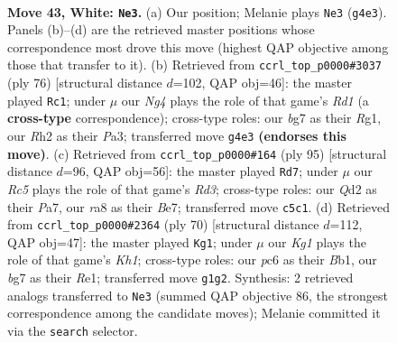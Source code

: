 \documentclass[11pt]{article}
\begin{document}
\clearpage

\begin{figure}[p]\centering
\begin{subfigure}{0.46\textwidth}\centering
\resizebox{\linewidth}{!}{%
\newchessgame
\chessboard[
  setfen={rn1qk2r/4n1b1/2p3p1/2Rp2P1/3P1PNp/1P5P/1B1QB2R/6K1 w - - 15 43},
  showmover=false,
  pgfstyle=straightmove, color=movearrow, markmove={g4-e3}
]}
\caption{}
\end{subfigure}\hfill
\begin{subfigure}{0.46\textwidth}\centering
\resizebox{\linewidth}{!}{%
\newchessgame
\chessboard[
  setfen={2r1q1kr/1b3pp1/p4n2/1p2pP1n/1P2P2P/P3QN1K/4N3/1B1R2R1 w - - 5 39},
  showmover=false,
  pgfstyle=straightmove, color=movearrow, markmove={d1-c1}
]}
\caption{}
\end{subfigure}
\\[4pt]
\begin{subfigure}{0.46\textwidth}\centering
\resizebox{\linewidth}{!}{%
\newchessgame
\chessboard[
  setfen={4k3/p3b2p/1p1rq1pP/2p1n3/2P1P3/3PB1P1/4QN2/5RK1 b - - 5 48},
  showmover=false,
  pgfstyle=straightmove, color=movearrow, markmove={d6-d7}
]}
\caption{}
\end{subfigure}\hfill
\begin{subfigure}{0.46\textwidth}\centering
\resizebox{\linewidth}{!}{%
\newchessgame
\chessboard[
  setfen={4qnk1/r3n1p1/4pp2/1p1b3p/2pP3P/2P3NQ/1P1B1PP1/1B2R2K w - - 15 36},
  showmover=false,
  pgfstyle=straightmove, color=movearrow, markmove={h1-g1}
]}
\caption{}
\end{subfigure}
\caption{\textbf{Move 43, White: \texttt{Ne3}.} (a) Our position; Melanie plays \texttt{Ne3} (\texttt{g4e3}). Panels (b)--(d) are the retrieved master positions whose correspondence most drove this move (highest QAP objective among those that transfer to it). (b) Retrieved from \texttt{ccrl\_top\_p0000\#3037} (ply 76) [structural distance $d$=102, QAP obj=46]: the master played \texttt{Rc1}; under $\mu$ our \emph{Ng4} plays the role of that game's \emph{Rd1} (a \textbf{cross-type} correspondence); cross-type roles: our \emph{b}g7 as their \emph{R}g1, our \emph{R}h2 as their \emph{P}a3; transferred move \texttt{g4e3} \textbf{(endorses this move)}. (c) Retrieved from \texttt{ccrl\_top\_p0000\#164} (ply 95) [structural distance $d$=96, QAP obj=56]: the master played \texttt{Rd7}; under $\mu$ our \emph{Rc5} plays the role of that game's \emph{Rd3}; cross-type roles: our \emph{Q}d2 as their \emph{P}a7, our \emph{r}a8 as their \emph{B}e7; transferred move \texttt{c5c1}. (d) Retrieved from \texttt{ccrl\_top\_p0000\#2364} (ply 70) [structural distance $d$=112, QAP obj=47]: the master played \texttt{Kg1}; under $\mu$ our \emph{Kg1} plays the role of that game's \emph{Kh1}; cross-type roles: our \emph{p}c6 as their \emph{B}b1, our \emph{b}g7 as their \emph{R}e1; transferred move \texttt{g1g2}. Synthesis: 2 retrieved analogs transferred to \texttt{Ne3} (summed QAP objective 86, the strongest correspondence among the candidate moves); Melanie committed it via the \texttt{search} selector.}
\label{fig:thought-m84}
\end{figure}
\end{document}

